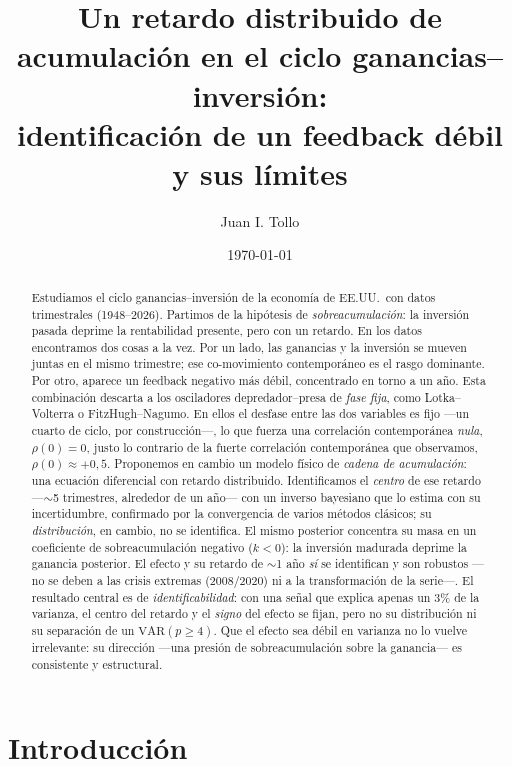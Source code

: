 \documentclass[11pt]{article}
\title{\vspace{-1.2cm}Un retardo distribuido de acumulación en el ciclo ganancias--inversión:\\
identificación de un feedback débil y sus límites}
\author{Juan I. Tollo}
\date{\today}
\begin{document}
\maketitle
\vspace{-0.7cm}

\begin{abstract}
\noindent
Estudiamos el ciclo ganancias--inversión de la economía de EE.UU.\ con datos trimestrales
(1948--2026). Partimos de la hipótesis de \emph{sobreacumulación}: la inversión pasada deprime la
rentabilidad presente, pero con un retardo. En los datos encontramos dos cosas a la vez. Por un
lado, las ganancias y la inversión se mueven juntas en el mismo trimestre; ese co-movimiento
contemporáneo es el rasgo dominante. Por otro, aparece un feedback negativo más débil, concentrado
en torno a un año. Esta combinación descarta a los osciladores depredador--presa de \emph{fase
fija}, como Lotka--Volterra o FitzHugh--Nagumo. En ellos el desfase entre las dos variables es fijo
---un cuarto de ciclo, por construcción---, lo que fuerza una correlación contemporánea \emph{nula},
$\rho(0)=0$, justo lo contrario de la fuerte correlación contemporánea que observamos,
$\rho(0)\approx+0{,}5$. Proponemos en cambio un modelo físico de \emph{cadena de acumulación}: una
ecuación diferencial con retardo distribuido. Identificamos el \emph{centro} de ese retardo ---$\sim$5 trimestres, alrededor de un año--- con un
inverso bayesiano que lo estima con su incertidumbre, confirmado por la convergencia de varios
métodos clásicos; su \emph{distribución}, en cambio, no se identifica. El mismo posterior concentra su
masa en un coeficiente de sobreacumulación negativo ($k<0$): la inversión madurada deprime la
ganancia posterior. El efecto y su retardo de $\sim$1 año \emph{sí} se identifican y son robustos
---no se deben a las crisis extremas (2008/2020) ni a la transformación de la serie---.
El resultado central es de \emph{identificabilidad}: con una señal que explica apenas un 3\% de la
varianza, el centro del retardo y el \emph{signo} del efecto se fijan, pero no su distribución ni su separación de un
$\mathrm{VAR}(p\!\ge\!4)$. Que el efecto sea débil en varianza no lo vuelve irrelevante: su dirección ---una presión de sobreacumulación sobre la ganancia--- es consistente y estructural.
\end{abstract}

\section{Introducción}
\end{document}
